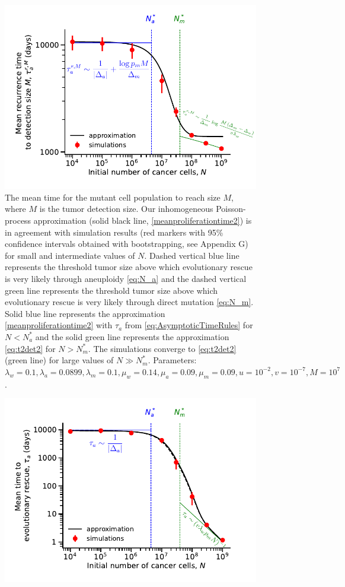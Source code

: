 \documentclass[12pt]{extarticle}
\begin{document}
\begin{appendices}
\begin{figure}
\includegraphics[width=1\textwidth]{Figures/RecurrencePlot.pdf}
\caption{The mean time for the mutant cell population to reach size $M$, where $M$ is the tumor detection size.
Our inhomogeneous Poisson-process approximation (solid black line, \cref{meanproliferationtime2}) is in agreement with simulation results (red markers with 95\% confidence intervals obtained with bootstrapping, see Appendix G) for small and intermediate values of $N$. Dashed vertical blue line represents the threshold tumor size above which evolutionary rescue is very likely through aneuploidy \cref{eq:N_a} and the dashed vertical green line represents the threshold tumor size above which evolutionary rescue is very likely through direct mutation \cref{eq:N_m}. Solid blue line represents the approximation \cref{meanproliferationtime2} with $\tau_a$ from \cref{eq:AsymptoticTimeRules} for $N<N_a^*$ and the solid green line  represents the approximation \cref{eq:t2det2} for $N>N_m^*$. The simulations converge to \cref{eq:t2det2} (green line) for large values of $N\gg N_m^*$.  Parameters: $\lambda_w=0.1,\lambda_a=0.0899,\lambda_m=0.1,\mu_w=0.14,\mu_a=0.09,\mu_m=0.09, u=10^{-2}, v=10^{-7}, M=10^7$.}
\label{RecurrencePlot}
\end{figure}
\begin{figure}
\vspace*{1\baselineskip}
\includegraphics[width=1\textwidth]{Figures/SGVEvolutionaryRescueTimeComplete.pdf}

\end{figure}
\end{appendices}
\end{document}
